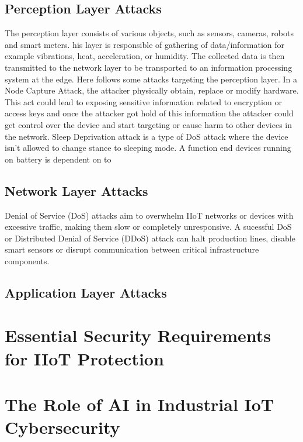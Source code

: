 \documentclass[article,a4paper]{IEEEtran}
\begin{document}
\subsection{Perception Layer Attacks}
The perception layer consists of various objects, such as sensors, cameras, robots and smart meters. his layer is responsible of gathering of data/information for example vibrations, heat, acceleration, or humidity. The collected data is then transmitted to the network layer to be transported to an information processing system at the edge. Here follows some attacks targeting the perception layer.
\newline\newline
In a Node Capture Attack, the attacker physically obtain, replace or modify hardware. This act could lead to exposing sensitive information related to encryption or access keys and once the attacker got hold of this information the attacker could get control over the device and start targeting or cause harm to other devices in the network. 
\newline\newline
Sleep Deprivation attack is a type of DoS attack where the device isn't allowed to change stance to sleeping mode. A function end devices running on battery is dependent on to 

\subsection{Network Layer Attacks}
Denial of Service (DoS) attacks aim to overwhelm IIoT networks or devices with excessive traffic, making them slow or completely unresponsive. A sucessful DoS or Distributed Denial of Service (DDoS) attack can halt production lines, disable smart sensors or disrupt communication between critical infrastructure components.
\newline\newline
\subsection{Application Layer Attacks}

\section{Essential Security Requirements for IIoT Protection}

\section{The Role of AI in Industrial IoT Cybersecurity}
\end{document}
